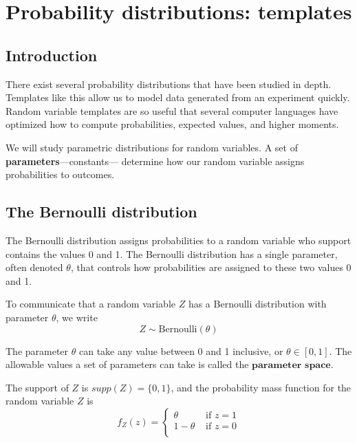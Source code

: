 \chapter{Probability distributions: templates}
\hspace{1mm}

\section{Introduction}\label{intro}

There exist several probability distributions that have been studied in depth.
Templates like this allow us to model data generated from an experiment quickly.
Random variable templates are so useful that several computer languages have optimized how to compute probabilities, expected values, and higher moments.

We will study parametric distributions for random variables.
A set of \textbf{parameters}---constants--- determine how our random variable assigns probabilities to outcomes.

\section{The Bernoulli distribution}

The Bernoulli distribution assigns probabilities to a random variable who support contains the values 0 and 1. The Bernoulli distribution has a single parameter, often denoted $\theta$, that controls how probabilities are assigned to these two values 0 and 1.

To communicate that a random variable $Z$ has a Bernoulli distribution with parameter $\theta$, we write 
\begin{equation}
    Z \sim \text{Bernoulli}(\theta)
\end{equation}

The parameter $\theta$ can take any value between 0 and 1 inclusive, or $\theta \in [0,1]$.
The allowable values a set of parameters can take is called the $\textbf{parameter space}$. 


The support of $Z$ is $supp(Z) = \{0,1\}$, and the probability mass function for the random variable $Z$ is 
\begin{equation}
    f_{Z}(z) = \begin{cases}
                   \theta & \text{ if } z=1\\
                   1- \theta & \text{ if } z=0\\
               \end{cases}
\end{equation}

